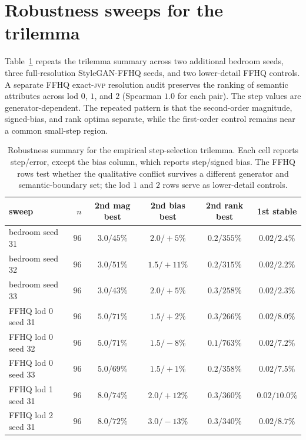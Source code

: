 \documentclass[10pt]{article}
\newcommand{\jvp}{\textsc{jvp}}
\begin{document}
\section{Robustness sweeps for the trilemma}
\label{app:robustness}
Table~\ref{tab:robustness} repeats the trilemma summary across two additional bedroom seeds, three
full-resolution StyleGAN-FFHQ seeds, and two lower-detail FFHQ controls. A separate FFHQ exact-\jvp{}
resolution audit preserves the ranking of semantic attributes across lod $0$, $1$, and $2$ (Spearman $1.0$
for each pair). The step values are generator-dependent. The repeated pattern is that the
second-order magnitude, signed-bias, and rank optima separate, while the first-order control
remains near a common small-step region.

\begin{table}[h]\centering
\small
\begin{tabular}{l r c c c c}
\toprule
sweep & $n$ & 2nd mag best & 2nd bias best & 2nd rank best & 1st stable \\
\midrule
bedroom seed 31 & $96$ & $3.0/45\%$ & $2.0/+5\%$  & $0.2/355\%$ & $0.02/2.4\%$ \\
bedroom seed 32 & $96$ & $3.0/51\%$ & $1.5/+11\%$ & $0.2/315\%$ & $0.02/2.2\%$ \\
bedroom seed 33 & $96$ & $3.0/43\%$ & $2.0/+5\%$  & $0.3/258\%$ & $0.02/2.3\%$ \\
FFHQ lod 0 seed 31 & $96$ & $5.0/71\%$ & $1.5/+2\%$  & $0.3/266\%$ & $0.02/8.0\%$ \\
FFHQ lod 0 seed 32 & $96$ & $5.0/71\%$ & $1.5/-8\%$  & $0.1/763\%$ & $0.02/7.2\%$ \\
FFHQ lod 0 seed 33 & $96$ & $5.0/69\%$ & $1.5/+1\%$  & $0.2/358\%$ & $0.02/7.5\%$ \\
FFHQ lod 1 seed 31 & $96$ & $8.0/74\%$ & $2.0/+12\%$ & $0.3/360\%$ & $0.02/10.0\%$ \\
FFHQ lod 2 seed 31 & $96$ & $8.0/72\%$ & $3.0/-13\%$ & $0.3/340\%$ & $0.02/8.7\%$ \\
\bottomrule
\end{tabular}
\caption{Robustness summary for the empirical step-selection trilemma. Each cell reports
step/error, except the bias column, which reports step/signed bias. The FFHQ rows test whether the
qualitative conflict survives a different generator and semantic-boundary set; the lod $1$ and $2$ rows
serve as lower-detail controls.}
\label{tab:robustness}
\end{table}
\end{document}
